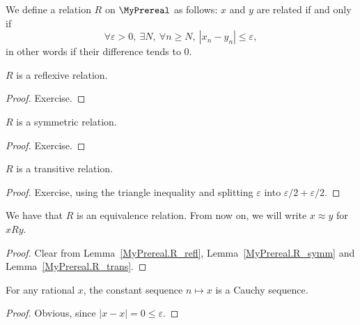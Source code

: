 \begin{definition}
    \label{MyPrereal.R}
    \leanok
We define a relation $R$ on $\MyPrereal$ as follows: $x$ and $y$ are related if and only if
\[
\forall \varepsilon > 0, \ \exists N, \ \forall n \geq N, \ |x_n - y_n| \leq \varepsilon,
\]
in other words if their difference tends to $0$.
\end{definition}

\begin{lemma}
$R$ is a reflexive relation.
    \label{MyPrereal.R_refl}
    \leanok
\end{lemma}
\begin{proof}
    \leanok
    Exercise.
\end{proof}

\begin{lemma}
$R$ is a symmetric relation.
    \label{MyPrereal.R_symm}
    \leanok
\end{lemma}
\begin{proof}
    \leanok
    Exercise.
\end{proof}

\begin{lemma}
$R$ is a transitive relation.
    \label{MyPrereal.R_trans}
    \leanok
\end{lemma}
\begin{proof}
    \leanok
    Exercise, using the triangle inequality and splitting $\varepsilon$ into $\varepsilon/2 +
    \varepsilon/2$.
\end{proof}

\begin{lemma}
    \label{MyPrereal.R_equiv}
    \leanok
We have that $R$ is an equivalence relation. From now on, we will write $x \approx y$ for $x R y$.
\end{lemma}
\begin{proof}
    \leanok
Clear from Lemma~\ref{MyPrereal.R_refl}, Lemma~\ref{MyPrereal.R_symm} and
Lemma~\ref{MyPrereal.R_trans}.
\end{proof}

\begin{lemma}
    \label{MyPrereal.IsCauchy.const}
    \leanok
For any rational $x$, the constant sequence $n \mapsto x$ is a Cauchy sequence.
\end{lemma}
\begin{proof}
    \leanok
    Obvious, since $|x - x| = 0 \leq \varepsilon$.
\end{proof}

